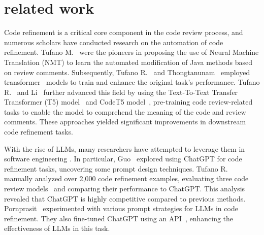 \section{related work}
Code refinement is a critical core component in the code review process, and numerous scholars have conducted research on the automation of code refinement. Tufano M.~\cite{tufano2019learning} were the pioneers in proposing the use of Neural Machine Translation (NMT) to learn the automated modification of Java methods based on review comments. Subsequently, Tufano R.~\cite{tufano2021towards} and Thongtanunam~\cite{thongtanunam2022autotransform} employed transformer~\cite{vaswani2017attention} models to train and enhance the original task’s performance. 
Tufano R.~\cite{tufano2022using} and Li~\cite{li2022automating} further advanced this field by using the Text-To-Text Transfer Transformer (T5) model~\cite{raffel2020exploring} and CodeT5 model~\cite{wang2021codet5}, pre-training code review-related tasks to enable the model to comprehend the meaning of the code and review comments. These approaches yielded significant improvements in downstream code refinement tasks.

With the rise of LLMs, many researchers have attempted to leverage them in software engineering \cite{ma2024specgen, ma2024speceval, kong2024contrastrepair, guo2024ft2ra, xia2023keep}. In particular, Guo~\cite{guo2024exploring} explored using ChatGPT for code refinement tasks, uncovering some prompt design techniques.
Tufano R.~\cite{tufano2024code} manually analyzed over 2,000 code refinement examples, evaluating three code review models~\cite{hong2022commentfinder, li2022automating, tufano2022using} and comparing their performance to ChatGPT. This analysis revealed that ChatGPT is highly competitive compared to previous methods. 
Pornprasit~\cite{pornprasit2024fine} experimented with various prompt strategies for LLMs in code refinement. They also fine-tuned ChatGPT using an API~\cite{ChatGPTblog}, enhancing the effectiveness of LLMs in this task.

